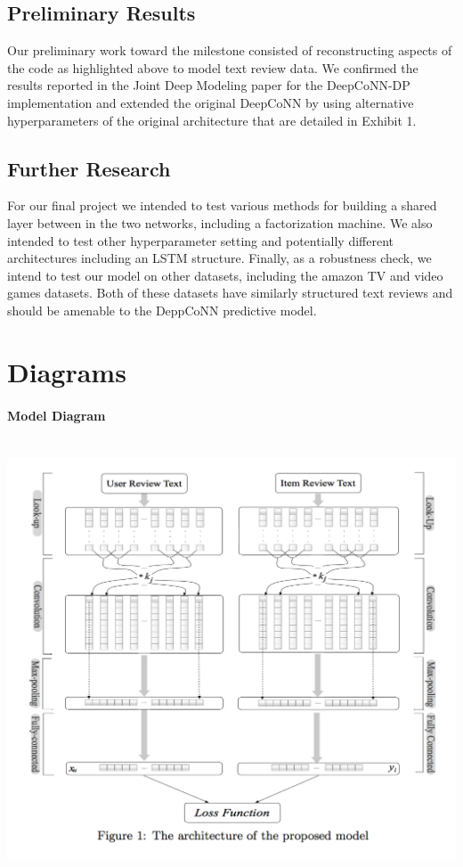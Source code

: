 \documentclass[10pt,twocolumn,letterpaper]{article}
\begin{document}
\subsection{Preliminary Results}

Our preliminary work toward the milestone consisted of reconstructing aspects of the code as highlighted above to model text review data. We confirmed the results reported in the Joint Deep Modeling paper for the DeepCoNN-DP implementation and extended the original DeepCoNN by using alternative hyperparameters of the original architecture that are detailed in Exhibit 1. 

\subsection{Further Research}

For our final project we intended to test various methods for building a shared layer between in the two networks, including a factorization machine. We also intended to test other hyperparameter setting and potentially different architectures including an LSTM structure. Finally, as a robustness check, we intend to test our model on other datasets, including the amazon TV and video games datasets. Both of these datasets have similarly structured text reviews and should be amenable to the DeppCoNN predictive model. 

\section{Diagrams}
\paragraph{Model Diagram} \ \newline
\includegraphics[scale=0.38]{DeepCoNN}
\end{document}
